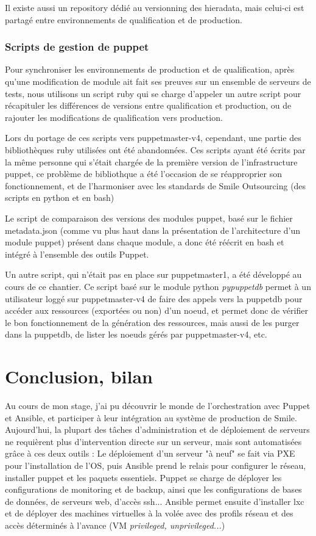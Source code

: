 \documentclass[14 pt]{extreport}
\begin{document}
Il existe aussi un repository dédié au versionning des hieradata, mais celui-ci est partagé entre environnements de qualification et de production.

\subsection{Scripts de gestion de puppet}

Pour synchroniser les environnements de production et de qualification, après qu'une modification de module ait fait ses preuves sur un ensemble de serveurs de tests, nous utilisons un script ruby qui se charge d'appeler un autre script pour récapituler les différences de versions entre qualification et production, ou de rajouter les modifications de qualification vers production.

Lors du portage de ces scripts vers puppetmaster-v4, cependant, une partie des bibliothèques ruby utilisées ont été abandonnées. Ces scripts ayant été écrits par la même personne qui s'était chargée de la première version de l'infrastructure puppet, ce problème de bibliothque a été l'occasion de se réapproprier son fonctionnement, et de l'harmoniser avec les standards de Smile Outsourcing (des scripts en python et en bash)

Le script de comparaison des versions des modules puppet, basé sur le fichier metadata.json (comme vu plus haut dans la présentation de l'architecture d'un module puppet) présent dans chaque module, a donc été réécrit en bash et intégré à l'ensemble des outils Puppet.

Un autre script, qui n'était pas en place sur puppetmaster1, a été développé au cours de ce chantier. Ce script basé sur le module python \emph{pypuppetdb} permet à un utilisateur loggé sur puppetmaster-v4 de faire des appels vers la puppetdb pour accéder aux ressources (exportées ou non) d'un noeud, et permet donc de vérifier le bon fonctionnement de la génération des ressources, mais aussi de les purger dans la puppetdb, de lister les noeuds gérés par puppetmaster-v4, etc.

\chapter{Conclusion, bilan}

Au cours de mon stage, j'ai pu découvrir le monde de l'orchestration avec Puppet et Ansible, et participer à leur intégration au système de production de Smile. Aujourd'hui, la plupart des tâches d'administration et de déploiement de serveurs ne requièrent plus d'intervention directe sur un serveur, mais sont automatisées grâce à ces deux outils : Le déploiement d'un serveur "à neuf" se fait via PXE pour l'installation de l'OS, puis Ansible prend le relais pour configurer le réseau, installer puppet et les paquets essentiels. Puppet se charge de déployer les configurations de monitoring et de backup, ainsi que les configurations de bases de données, de serveurs web, d'accès ssh... Ansible permet ensuite d'installer lxc et de déployer des machines virtuelles à la volée avec des profils réseau et des accès déterminés à l'avance (VM \emph{privileged, unprivileged...})
\end{document}
